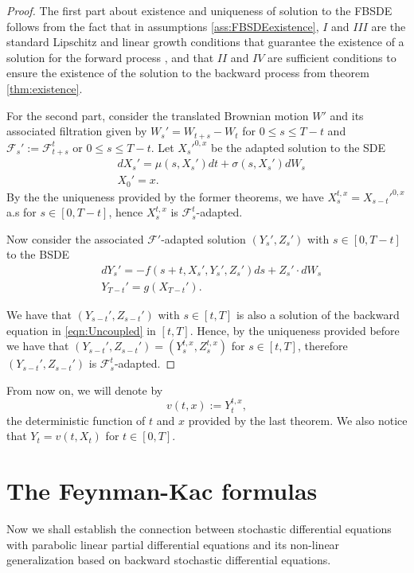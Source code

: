 \begin{proof}
	The first part about existence and uniqueness of solution to the FBSDE follows from the fact that in assumptions \ref{ass:FBSDEexistence}, $I$ and $III$ are the standard Lipschitz and linear growth conditions that guarantee the existence of a solution for the forward process \cite{mao_stochastic_2008}, and that $II$ and $IV$ are sufficient conditions to ensure the existence of the solution to the backward process from theorem \ref{thm:existence}.
	
	For the second part, consider the translated Brownian motion $W'$ and its associated filtration given by $W_s'=W_{t+s}-W_t$ for $0\leq s\leq T-t$ and $\mathcal{F}_s':=\mathcal{F}_{t+s}^t$ or $0\leq s\leq T-t$. Let $X_s'^{0,x}$ be the adapted solution to the SDE
	\begin{equation}
		\begin{split}
			&dX_s'=\mu(s,X_s')dt+\sigma(s,X_s')dW_s\\
			&X_0'=x.
		\end{split}
	\end{equation}
	By the the uniqueness provided by the former theorems, we have $X_s^{t,x}=X_{s-t}'^{0,x}$ a.s for $s\in[0,T-t]$, hence $X_s^{t,x}$ is $\mathcal{F}_{s}^{t}$-adapted.
	
	Now consider the associated $\mathcal{F}'$-adapted solution $(Y_s',Z_s')$ with $s\in[0,T-t]$ to the BSDE
	\begin{equation}
		\begin{split}
			&dY_s'=-f(s+t,X_s',Y_s',Z_s')ds+Z_s'\cdot dW_s \\
			&Y_{T-t}'=g(X_{T-t}').
		\end{split}
	\end{equation}

We have that $(Y_{s-t}',Z_{s-t}')$ with $s\in[t,T]$ is also a solution of the backward equation in \eqref{eqn:Uncoupled} in $[t,T]$. Hence, by the  uniqueness provided before we have that $(Y_{s-t}',Z_{s-t}')=(Y_{s}^{t,x},Z_{s}^{t,x})$ for $s\in[t,T]$, therefore $(Y_{s-t}',Z_{s-t}')$ is $\mathcal{F}_{s}^{t}$-adapted.

\end{proof}
From now on, we will denote by
\begin{equation}
	v(t,x):=Y_{t}^{t,x},
\end{equation}
the deterministic function of $t$ and $x$ provided by the last theorem. We also notice that $Y_t=v(t,X_t)$ for $t\in[0,T]$. 
\section{The Feynman-Kac formulas}
Now we shall establish the connection between stochastic differential equations with parabolic linear partial differential equations and its non-linear generalization based on backward stochastic differential equations. 
